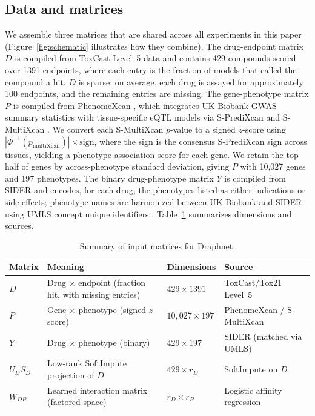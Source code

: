 \documentclass[11pt]{article}
\begin{document}
\subsection{Data and matrices}

We assemble three matrices that are shared across all experiments in
this paper (Figure~\ref{fig:schematic} illustrates how they combine).
The drug-endpoint matrix $D$
is compiled from ToxCast Level~5 data \citep{richard2016toxcast} and
contains 429 compounds scored over 1391 endpoints, where each entry is
the fraction of models that called the compound a hit. $D$ is sparse:
on average, each drug is assayed for approximately 100 endpoints, and
the remaining entries are missing. The gene-phenotype matrix $P$ is
compiled from PhenomeXcan \citep{pividori2020phenomexcan}, which
integrates UK Biobank GWAS summary statistics with tissue-specific eQTL
models via S-PrediXcan and S-MultiXcan
\citep{barbeira2018spredixcan,barbeira2019smultixcan}. We convert each
S-MultiXcan $p$-value to a signed $z$-score using
$|\Phi^{-1}(p_{\text{multiXcan}})| \times \mathrm{sign}$, where the
sign is the consensus S-PrediXcan sign across tissues, yielding a
phenotype-association score for each gene. We retain the top half of
genes by across-phenotype standard deviation, giving $P$ with 10,027
genes and 197 phenotypes. The binary drug-phenotype matrix $Y$ is
compiled from SIDER \citep{kuhn2016sider} and encodes, for each drug,
the phenotypes listed as either indications or side effects; phenotype
names are harmonized between UK Biobank and SIDER using UMLS concept
unique identifiers \citep{bodenreider2004umls}. Table~\ref{tab:matrices}
summarizes dimensions and sources.

\begin{table}[htbp]
\centering
\caption{Summary of input matrices for Draphnet.}
\label{tab:matrices}
\begin{tabular}{llll}
\toprule
Matrix & Meaning & Dimensions & Source \\
\midrule
$D$ & Drug $\times$ endpoint (fraction hit, with missing entries) & $429 \times 1391$ & ToxCast/Tox21 Level~5 \\
$P$ & Gene $\times$ phenotype (signed $z$-score) & $10{,}027 \times 197$ & PhenomeXcan / S-MultiXcan \\
$Y$ & Drug $\times$ phenotype (binary) & $429 \times 197$ & SIDER (matched via UMLS) \\
$U_D S_D$ & Low-rank SoftImpute projection of $D$ & $429 \times r_D$ & SoftImpute on $D$ \\
$W_{DP}$ & Learned interaction matrix (factored space) & $r_D \times r_P$ & Logistic affinity regression \\
\bottomrule
\end{tabular}
\end{table}
\end{document}
